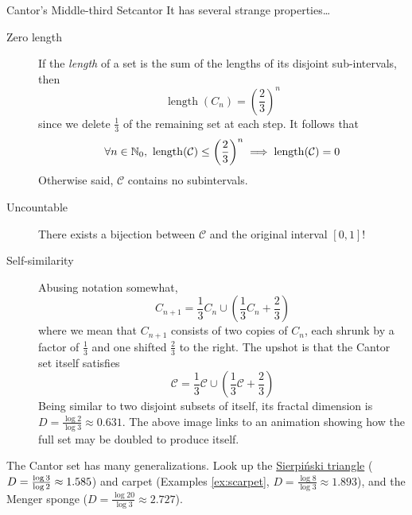\begin{example}{Cantor's Middle-third Set}{cantor}
It has several strange properties\ldots
\begin{description}%
  \item[Zero length] If the \emph{length} of a set is the sum of the lengths of its disjoint sub-intervals, then
	\[\operatorname{length}(C_n)=\left(\frac 23\right)^n\]
	since we delete $\frac 13$ of the remaining set at each step. It follows that
  \[\forall n\in\mathbb{N}_0,\ \operatorname{length}(\mathcal C)\le \left(\frac 23\right)^n \implies \operatorname{length}(\mathcal C)=0\]
  Otherwise said, $\mathcal C$ contains no subintervals.
  \item[Uncountable] There exists a bijection between $\mathcal C$ and the original interval $[0,1]$!
  \item[Self-similarity] Abusing notation somewhat,
	\[C_{n+1}=\frac 13C_n\cup\left(\frac 13C_n+\frac 23\right)\]
	where we mean that $C_{n+1}$ consists of two copies of $C_n$, each shrunk by a factor of $\frac 13$ and one shifted $\frac 23$ to the right. The upshot is that the Cantor set itself satisfies
	\[\mathcal C=\frac 13\mathcal C\cup\left(\frac 13\mathcal C+\frac 23\right)\]
	Being similar to two disjoint subsets of itself, its fractal dimension is $D=\frac{\log 2}{\log 3}\approx 0.631$. The above image links to an animation showing how the full set may be doubled to produce itself.
\end{description}

The Cantor set has many generalizations. Look up the \href{https://en.wikipedia.org/wiki/Sierpiński_triangle}{Sierpiński triangle} ($D=\smash{\frac{\log 3}{\log 2}}\approx 1.585$) and carpet (Examples \ref{ex:scarpet}, $D=\frac{\log 8}{\log 3}\approx 1.893$), and the Menger sponge ($D=\frac{\log 20}{\log 3}\approx 2.727$).
\end{example}


\goodbreak


